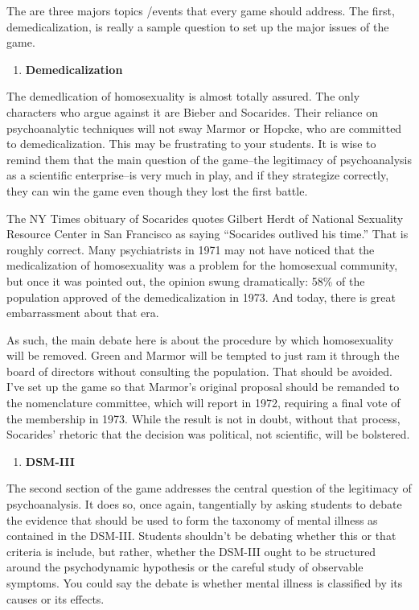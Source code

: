 \begin{refsection}
The are three majors topics \slash  events that every game should address. The first, demedicalization, is really a sample question to set up the major issues of the game.

\begin{enumerate}
\item \textbf{Demedicalization}

\end{enumerate}

The demedlication of homosexuality is almost totally assured. The only characters who argue against it are Bieber and Socarides. Their reliance on psychoanalytic techniques will not sway Marmor or Hopcke, who are committed to demedicalization. This may be frustrating to your students. It is wise to remind them that the main question of the game--the legitimacy of psychoanalysis as a scientific enterprise--is very much in play, and if they strategize correctly, they can win the game even though they lost the first battle.

The NY Times obituary of Socarides quotes Gilbert Herdt of National Sexuality Resource Center in San Francisco as saying ``Socarides outlived his time.'' That is roughly correct. Many psychiatrists in 1971 may not have noticed that the medicalization of homosexuality was a problem for the homosexual community, but once it was pointed out, the opinion swung dramatically: 58\% of the population approved of the demedicalization in 1973. And today, there is great embarrassment about that era. 

As such, the main debate here is about the procedure by which homosexuality will be removed. Green and Marmor will be tempted to just ram it through the board of directors without consulting the population. That should be avoided. I've set up the game so that Marmor's original proposal should be remanded to the nomenclature committee, which will report in 1972, requiring a final vote of the membership in 1973. While the result is not in doubt, without that process, Socarides' rhetoric that the decision was political, not scientific, will be bolstered.

\begin{enumerate}
\item \textbf{DSM-III}

\end{enumerate}

The second section of the game addresses the central question of the legitimacy of psychoanalysis. It does so, once again, tangentially by asking students to debate the evidence that should be used to form the taxonomy of mental illness as contained in the DSM-III. Students shouldn't be debating whether this or that criteria is include, but rather, whether the DSM-III ought to be structured around the psychodynamic hypothesis or the careful study of observable symptoms. You could say the debate is whether mental illness is classified by its causes or its effects.


\end{refsection}
